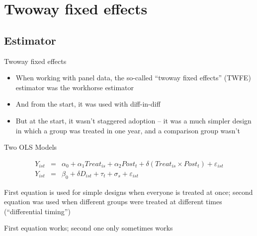 \documentclass{beamer}
\begin{document}
\section{Twoway fixed effects}


\subsection{Estimator }




\begin{frame}{Twoway fixed effects}

\begin{itemize}
\item When working with panel data, the so-called ``twoway fixed effects'' (TWFE) estimator was the workhorse estimator
\item And from the start, it was used with diff-in-diff
\item But at the start, it wasn't staggered adoption -- it was a much simpler design in which a group was treated in one year, and a comparison group wasn't
\end{itemize}

\end{frame}

\begin{frame}{Two OLS Models}

\begin{eqnarray}
Y_{ist} &=& \alpha_0 + \alpha_1 Treat_{is} + \alpha_2 Post_{t} + \delta (Treat_{is} \times Post_t) + \varepsilon_{ist} \\
Y_{ist} &=& \beta_0 + \delta D_{ist} + \tau_t + \sigma_s + \varepsilon_{ist}
\end{eqnarray}

\bigskip

First equation is used for simple designs when everyone is treated at once; second equation was used when different groups were treated at different times (``differential timing'')

\bigskip

First equation works; second one only sometimes works

\end{frame}
\end{document}

